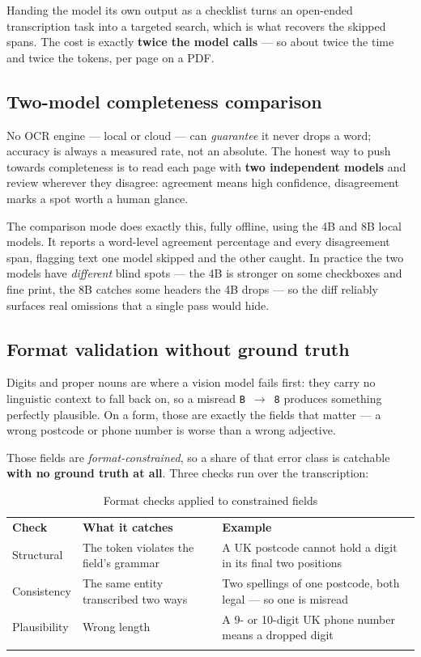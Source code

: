 \documentclass[11pt,a4paper]{article}
\newcommand{\toprule}{\noalign{\hrule height 0.9pt}\noalign{\vskip 3pt}}
\newcommand{\midrule}{\noalign{\vskip 3pt}\noalign{\hrule height 0.4pt}\noalign{\vskip 3pt}}
\newcommand{\bottomrule}{\noalign{\vskip 3pt}\noalign{\hrule height 0.9pt}}
\begin{document}
Handing the model its own output as a checklist turns an open-ended
transcription task into a targeted search, which is what recovers the skipped
spans. The cost is exactly \textbf{twice the model calls} --- so about twice the
time and twice the tokens, per page on a PDF.

\subsection{Two-model completeness comparison}

No OCR engine --- local or cloud --- can \emph{guarantee} it never drops a word;
accuracy is always a measured rate, not an absolute. The honest way to push
towards completeness is to read each page with \textbf{two independent models}
and review wherever they disagree: agreement means high confidence,
disagreement marks a spot worth a human glance.

The comparison mode does exactly this, fully offline, using the 4B and 8B local
models. It reports a word-level agreement percentage and every disagreement
span, flagging text one model skipped and the other caught. In practice the two
models have \emph{different} blind spots --- the 4B is stronger on some
checkboxes and fine print, the 8B catches some headers the 4B drops --- so the
diff reliably surfaces real omissions that a single pass would hide.

\subsection{Format validation without ground truth}

Digits and proper nouns are where a vision model fails first: they carry no
linguistic context to fall back on, so a misread \texttt{B}~$\rightarrow$~\texttt{8}
produces something perfectly plausible. On a form, those are exactly the fields
that matter --- a wrong postcode or phone number is worse than a wrong
adjective.

Those fields are \emph{format-constrained}, so a share of that error class is
catchable \textbf{with no ground truth at all}. Three checks run over the
transcription:

\begin{table}[H]
\centering
\begin{tabular}{@{}L{2.8cm}L{5.4cm}L{5.6cm}@{}}
\toprule
\textbf{Check} & \textbf{What it catches} & \textbf{Example} \\
\midrule
Structural & The token violates the field's grammar &
  A UK postcode cannot hold a digit in its final two positions \\
Consistency & The same entity transcribed two ways &
  Two spellings of one postcode, both legal --- so one is misread \\
Plausibility & Wrong length &
  A 9- or 10-digit UK phone number means a dropped digit \\
\bottomrule
\end{tabular}
\caption{Format checks applied to constrained fields}
\end{table}
\end{document}

